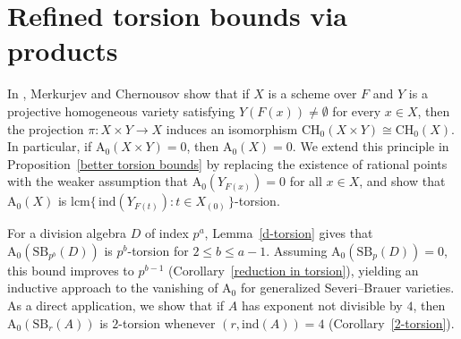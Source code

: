 \documentclass[10pt]{amsart}
\theoremstyle{plain}
\theoremstyle{definition}
\begin{document}
\section{Refined torsion bounds via products}\label{Refined torsion bounds via products}

In \cite[Proposition~4.1]{MC}, Merkurjev and Chernousov show that if \(X\) is a scheme over \(F\) and \(Y\) is a projective homogeneous variety satisfying \(Y(F(x)) \neq \emptyset\) for every \(x \in X\), then the projection \(\pi : X \times Y \to X\) induces an isomorphism \(\mathrm{CH_0}(X \times Y) \cong \mathrm{CH_0}(X)\). In particular, if \(\mathrm{A_0}(X \times Y)=0\), then \(\mathrm{A_0}(X)=0\). We extend this principle in Proposition~\ref{better torsion bounds} by replacing the existence of rational points with the weaker assumption that \(\mathrm{A_0}(Y_{F(x)})=0\) for all \(x \in X\), and show that \(\mathrm{A_0}(X)\) is \(\mathrm{lcm}\{\,\mathrm{ind}(Y_{F(t)}) : t \in X_{(0)}\,\}\)-torsion.

For a division algebra \(D\) of index \(p^a\), Lemma~\ref{d-torsion} gives that \(\mathrm{A_0}(\mathrm{SB}_{p^b}(D))\) is \(p^b\)-torsion for \(2 \le b \le a-1\). Assuming \(\mathrm{A_0}(\mathrm{SB}_p(D))=0\), this bound improves to \(p^{b-1}\) (Corollary~\ref{reduction in torsion}), yielding an inductive approach to the vanishing of \(\mathrm{A_0}\) for generalized Severi--Brauer varieties. As a direct application, we show that if \(A\) has exponent not divisible by \(4\), then \(\mathrm{A_0}(\mathrm{SB}_r(A))\) is \(2\)-torsion whenever \((r,\mathrm{ind}(A))=4\) (Corollary~\ref{2-torsion}).
\end{document}
